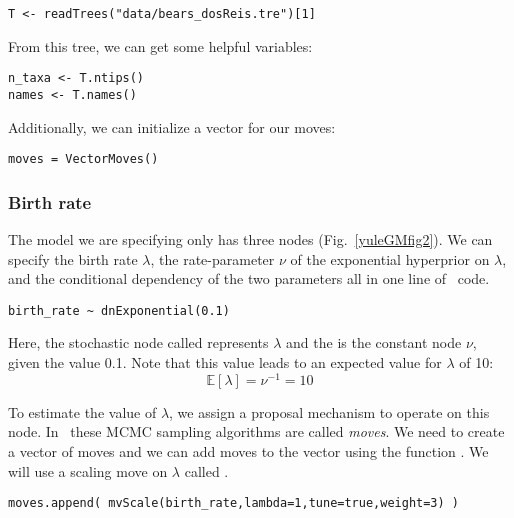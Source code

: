 {\tt \begin{snugshade*}
\begin{lstlisting}
T <- readTrees("data/bears_dosReis.tre")[1]
\end{lstlisting}
\end{snugshade*}}

From this tree, we can get some helpful variables:
{\tt \begin{snugshade*}
\begin{lstlisting}
n_taxa <- T.ntips()
names <- T.names()
\end{lstlisting}
\end{snugshade*}}

Additionally, we can initialize a vector for our moves:
{\tt \begin{snugshade*}
\begin{lstlisting}
moves = VectorMoves() 
\end{lstlisting}
\end{snugshade*}}

\subsubsection{Birth rate}

The model we are specifying only has three nodes (Fig.~\ref{yuleGMfig2}). 
We can specify the birth rate $\lambda$, the rate-parameter $\nu$ of the exponential hyperprior on $\lambda$, and the conditional dependency of the two parameters all in one line of \Rev~code.
{\tt \begin{snugshade*}
\begin{lstlisting}
birth_rate ~ dnExponential(0.1) 
\end{lstlisting}
\end{snugshade*}}
Here, the stochastic node called  represents $\lambda$ and the  is the constant node $\nu$, given the value 0.1. 
Note that this value leads to an expected value for $\lambda$ of 10:
$$\mathbb{E}[\lambda]=\nu^{-1} = 10$$

To estimate the value of $\lambda$, we assign a proposal mechanism to operate on this node. 
In \RevBayes~these MCMC sampling algorithms are called \textit{moves}. 
We need to create a vector of moves and we can add moves to the vector using the function .
We will use a scaling move on $\lambda$ called .
{\tt \begin{snugshade*}
\begin{lstlisting}
moves.append( mvScale(birth_rate,lambda=1,tune=true,weight=3) )
\end{lstlisting}
\end{snugshade*}}


